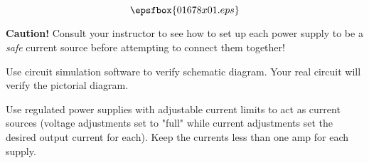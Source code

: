 

$$\epsfbox{01678x01.eps}$$

{\bf Caution!}  Consult your instructor to see how to set up each power supply to be a {\it safe} current source before attempting to connect them together!

\vfil \eject






Use circuit simulation software to verify schematic diagram.  Your real circuit will verify the pictorial diagram.







Use regulated power supplies with adjustable current limits to act as current sources (voltage adjustments set to "full" while current adjustments set the desired output current for each).  Keep the currents less than one amp for each supply.




